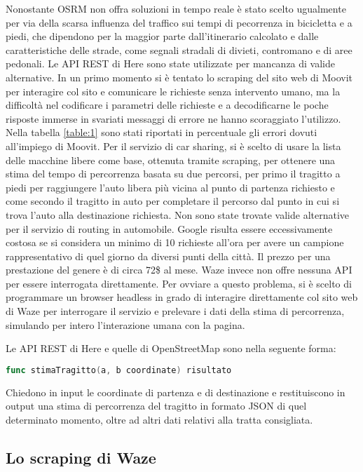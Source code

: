 Nonostante OSRM non offra soluzioni in tempo reale è stato scelto ugualmente per via della scarsa influenza del traffico sui tempi di pecorrenza in bicicletta e a piedi, che dipendono per la maggior parte dall'itinerario calcolato e dalle caratteristiche delle strade, come segnali stradali di divieti, contromano e di aree pedonali. Le API REST di Here sono state utilizzate per mancanza di valide alternative. In un primo momento si è tentato lo scraping del sito web di Moovit per interagire col sito e comunicare le richieste senza intervento umano, ma la difficoltà nel codificare i parametri delle richieste e a decodificarne le poche risposte immerse in svariati messaggi di errore ne hanno scoraggiato l'utilizzo. Nella tabella \ref{table:1} sono stati riportati in percentuale gli errori dovuti all'impiego di Moovit. Per il servizio di car sharing, si è scelto di usare la lista delle macchine libere come base, ottenuta tramite scraping, per ottenere una stima del tempo di percorrenza basata su due percorsi, per primo il tragitto a piedi per raggiungere l'auto libera più vicina al punto di partenza richiesto e come secondo il tragitto in auto per completare il percorso dal punto in cui si trova l'auto alla destinazione richiesta. Non sono state trovate valide alternative per il servizio di routing in automobile. Google risulta essere eccessivamente costosa se si considera un minimo di 10 richieste all'ora per avere un campione rappresentativo di quel giorno da diversi punti della città. Il prezzo per una prestazione del genere è di circa 72\$ al mese. Waze invece non offre nessuna API per essere interrogata direttamente. Per ovviare a questo problema, si è scelto di programmare un browser headless in grado di interagire direttamente col sito web di Waze per interrogare il servizio e prelevare i dati della stima di percorrenza, simulando per intero l'interazione umana con la pagina.

Le API REST di Here e quelle di OpenStreetMap sono nella seguente forma:

\begin{lstlisting}[language=Go]
func stimaTragitto(a, b coordinate) risultato
\end{lstlisting}

Chiedono in input le coordinate di partenza e di destinazione e restituiscono in output una stima di percorrenza del tragitto in formato JSON di quel determinato momento, oltre ad altri dati relativi alla tratta consigliata.

\subsection{Lo scraping di Waze}

